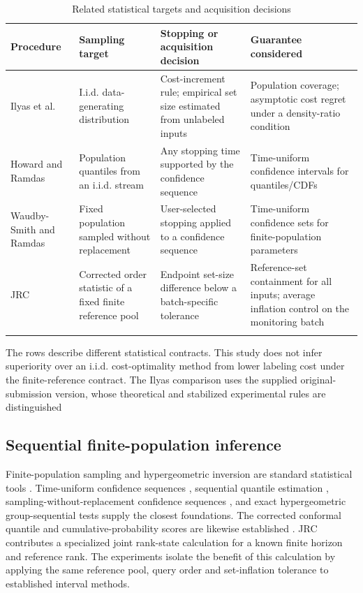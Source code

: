 \documentclass[pdflatex,sn-basic,Numbered,iicol]{sn-jnl}
\begin{document}
\begin{table}[t]
\centering\small\setlength{\tabcolsep}{4pt}
\caption{Related statistical targets and acquisition decisions}\label{tab:related}
\begin{tabular}{p{24mm}p{38mm}p{42mm}p{44mm}}
\toprule
Procedure & Sampling target & Stopping or acquisition decision & Guarantee considered \\
\midrule
Ilyas et al.\ \cite{ilyas} & I.i.d. data-generating distribution & Cost-increment rule; empirical set size estimated from unlabeled inputs & Population coverage; asymptotic cost regret under a density-ratio condition \\
Howard and Ramdas\ \cite{howard2022} & Population quantiles from an i.i.d. stream & Any stopping time supported by the confidence sequence & Time-uniform confidence intervals for quantiles/CDFs \\
Waudby-Smith and Ramdas\ \cite{wor} & Fixed population sampled without replacement & User-selected stopping applied to a confidence sequence & Time-uniform confidence sets for finite-population parameters \\
JRC & Corrected order statistic of a fixed finite reference pool & Endpoint set-size difference below a batch-specific tolerance & Reference-set containment for all inputs; average inflation control on the monitoring batch \\
\botrule
\end{tabular}
\begin{minipage}{\textwidth}\footnotesize The rows describe different statistical contracts. This study does not infer superiority over an i.i.d. cost-optimality method from lower labeling cost under the finite-reference contract. The Ilyas comparison uses the supplied original-submission version, whose theoretical and stabilized experimental rules are distinguished\end{minipage}
\end{table}

\subsection{Sequential finite-population inference}
Finite-population sampling and hypergeometric inversion are standard statistical tools \cite{cochran}. Time-uniform confidence sequences \cite{howard2021}, sequential quantile estimation \cite{howard2022}, sampling-without-replacement confidence sequences \cite{wor}, and exact hypergeometric group-sequential tests \cite{jin} supply the closest foundations. The corrected conformal quantile and cumulative-probability scores are likewise established \cite{angelopoulos,romano}. JRC contributes a specialized joint rank-state calculation for a known finite horizon and reference rank. The experiments isolate the benefit of this calculation by applying the same reference pool, query order and set-inflation tolerance to established interval methods.
\end{document}
